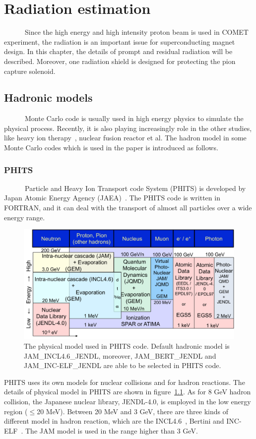 \chapter{Radiation estimation}
~~~~~~Since the high energy and high intensity proton beam is used in COMET experiment, the radiation is an important issue for superconducting magnet design.
In this chapter, the details of prompt and residual radiation will be described.
Moreover, one radiation shield is designed for protecting the pion capture solenoid.

 \section{Hadronic models}
~~~~~~Monte Carlo code is usually used in high energy physics to simulate the physical process.
Recently, it is also playing increasingly role in the other studies, like heavy ion therapy~\cite{therapy}, nuclear fusion reactor et al.
The hadron model in some Monte Carlo codes which is used in the paper is introduced as follows.

  \subsection{PHITS}
~~~~~~Particle and Heavy Ion Transport code System (PHITS) is developed by Japan Atomic Energy Agency (JAEA)~\cite{phits}.
The PHITS code is written in FORTRAN, and it can deal with the transport of almost all particles over a wide energy range. 
\begin{figure}[H]
 \centering
 \includegraphics[scale=0.43]{chapter3/fig/physicalmodel.pdf}
 \caption{The physical model used in PHITS code. Default hadronic model is JAM\_INCL4.6\_JENDL, moreover, JAM\_BERT\_JENDL and JAM\_INC-ELF\_JENDL are able to be selected in PHITS code.}
 \label{phitsmodel}
\end{figure}
PHITS uses its own models for nuclear collisions and for hadron reactions.
The details of physical model in PHITS are shown in figure~\ref{phitsmodel}.
As for 8 GeV hadron collision, the Japanese nuclear library, JENDL-4.0, is employed in the low energy region ($\le$20 MeV).
Between 20 MeV and 3 GeV, there are three kinds of different model in hadron reaction, which are the INCL4.6~\cite{incl}, Bertini and INC-ELF~\cite{incelf}.
The JAM model is used in the range higher than 3 GeV.


